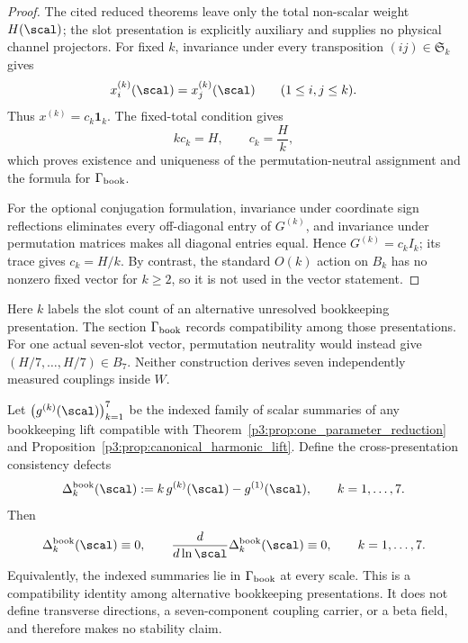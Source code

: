 \documentclass[11pt,a4paper]{article}
\begin{document}
\begin{proof}
The cited reduced theorems leave only the total non-scalar weight
\(H(\scal)\); the slot presentation is explicitly auxiliary and supplies no
physical channel projectors.  For fixed \(k\), invariance under every
transposition \((ij)\in\mathfrak S_k\) gives
\[
 x_i^{(k)}(\scal)=x_j^{(k)}(\scal)
 \qquad(1\le i,j\le k).
\]
Thus \(x^{(k)}=c_k\mathbf1_k\).  The fixed-total condition gives
\[
 k c_k=H,
 \qquad c_k=\frac Hk,
\]
which proves existence and uniqueness of the permutation-neutral assignment
and the formula for \(\Gamma_{\rm book}\).

For the optional conjugation formulation, invariance under coordinate sign
reflections eliminates every off-diagonal entry of \(G^{(k)}\), and invariance
under permutation matrices makes all diagonal entries equal.  Hence
\(G^{(k)}=c_kI_k\); its trace gives \(c_k=H/k\).  By contrast, the standard
\(O(k)\) action on \(B_k\) has no nonzero fixed vector for \(k\ge2\), so it is
not used in the vector statement.
\end{proof}

\begin{remark}
Here \(k\) labels the slot count of an alternative unresolved bookkeeping
presentation.  The section \(\Gamma_{\rm book}\) records compatibility among
those presentations.  For one actual seven-slot vector, permutation neutrality
would instead give
\((H/7,\ldots,H/7)\in B_7\).  Neither construction derives seven
independently measured couplings inside \(W\).
\end{remark}

\begin{theorem}
\label{p3:thm:no_transverse_running}
Let \(\bigl(g^{(k)}(\scal)\bigr)_{k=1}^7\) be the indexed family of scalar
summaries of any bookkeeping lift compatible with
Theorem~\ref{p3:prop:one_parameter_reduction} and
Proposition~\ref{p3:prop:canonical_harmonic_lift}.  Define the
cross-presentation consistency defects
\[
 \Delta_k^{\rm book}(\scal)
 :=k\,g^{(k)}(\scal)-g^{(1)}(\scal),
 \qquad k=1,\dots,7.
\]
Then
\[
 \Delta_k^{\rm book}(\scal)\equiv0,
 \qquad
 \frac{d}{d\ln\scal}\Delta_k^{\rm book}(\scal)\equiv0,
 \qquad k=1,\dots,7.
\]
Equivalently, the indexed summaries lie in \(\Gamma_{\rm book}\) at every
scale.  This is a compatibility identity among alternative bookkeeping
presentations.  It does not define transverse directions, a seven-component
coupling carrier, or a beta field, and therefore makes no stability claim.
\end{theorem}
\end{document}
